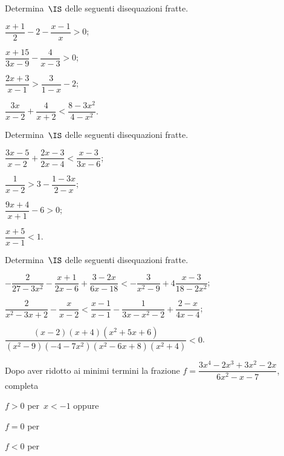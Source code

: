 \begin{esercizio}[\Ast]
\label{ese:20.67}
Determina~$\IS$ delle seguenti disequazioni fratte.
\begin{multicols}{2}
\begin{enumeratea}
\spazielenx
 \item $\dfrac{x+1}{2}-2-\dfrac{x-1}{x}>0$;
\item $\dfrac{x+15}{3x-9}-\dfrac{4}{x-3}>0$;
\item $\dfrac{2x+3}{x-1}>\dfrac{3}{1-x}-2$;
\item $\dfrac{3x}{x-2}+\dfrac{4}{x+2}<\dfrac{8-3x^{2}}{4-x^{2}}$.
\end{enumeratea}
\end{multicols}
\end{esercizio}

\begin{esercizio}[\Ast]
\label{ese:20.68}
Determina~$\IS$ delle seguenti disequazioni fratte.
\begin{multicols}{2}
\begin{enumeratea}
\spazielenx
\item $\dfrac{3x-5}{x-2}+\dfrac{2x-3}{2x-4}<\dfrac{x-3}{3x-6}$;
\item $\dfrac{1}{x-2}>3-\dfrac{1-3x}{2-x}$;
\item $\dfrac{9x+4}{x+1}-6>0$;
\item $\dfrac{x+5}{x-1}<1$.
\end{enumeratea}
\end{multicols}
\end{esercizio}

\begin{esercizio}[\Ast]
\label{ese:20.69}
Determina~$\IS$ delle seguenti disequazioni fratte.

\begin{enumeratea}
 \item $-{\dfrac{2}{27-3x^{2}}}-\dfrac{x+1}{2x-6}+\dfrac{3-2x}{6x-18}<-{\dfrac{3}{x^{2}-9}}+4\dfrac{x-3}{18-2x^{2}}$;
\item $\dfrac{2}{x^{2}-3x+2}-\dfrac{x}{x-2}<\dfrac{x-1}{x-1}-\dfrac{1}{3x-x^{2}-2}+\dfrac{2-x}{4x-4}$;
\item $\dfrac{(x-2)(x+4)(x^{2}+5x+6)}{(x^{2}-9)(-4-7x^{2})(x^{2}-6x+8)(x^{2}+4)}<0$.
\end{enumeratea}
\end{esercizio}

\begin{esercizio}
\label{ese:20.70}
Dopo aver ridotto ai minimi termini la frazione
$f=\dfrac{3x^{4}-2x^{3}+3x^{2}-2x}{6x^{2}-x-7}$, completa

 \begin{enumeratea}
 \item $f>0$ per~$x<-1$ oppure \dotfill
 \item $f=0$ per \dotfill
 \item $f<0$ per \dotfill
 \end{enumeratea}
\end{esercizio}


